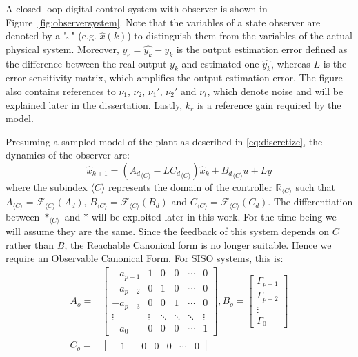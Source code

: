 \documentclass[sigconf]{llncs}
\newcommand{\mat}[1]{{#1}}
\renewcommand{\vec}[1]{{#1}}
\begin{document}
A closed-loop digital control system with observer is shown in Figure~\ref{fig:observersystem}.
Note that the variables of a state observer are denoted by a "$~\hat{}~$" (e.g. {$\hat {\vec{x}}(k)$})
to distinguish them from the variables of the actual physical system.
Moreover, $\vec{y}_e=\hat{\vec{y}_k}-\vec{y}_k$ is the output estimation error defined
as the difference between the real output $\vec{y}_k$ and estimated one $\hat{\vec{y}_k}$, whereas
$\mat{L}$ is the error sensitivity matrix, which amplifies the output estimation error.
The figure also contains references to $\nu_1$, $\nu_2$, $\nu_1'$, $\nu_2'$ and $\nu_t$, which
denote noise and will be explained later in the dissertation.
Lastly, $k_r$ is a reference gain required by the model.

Presuming a sampled model of the plant as described in \eqref{eq:discretize}, the dynamics of the observer are:
\begin{equation}
\label{eq:to_of}
\hat{\vec{x}}_{k+1}=({\mat{A}_d}_{\langle C \rangle}-\mat{L}{\mat{C}_d}_{\langle C \rangle})\hat{\vec{x}}_k+{\mat{B}_d}_{\langle C \rangle}\vec{u}+\mat{L}\vec{y}
\end{equation}
where the subindex ${\langle C \rangle}$ represents the domain of the controller $\mathbb{R}_{\langle C \rangle}$ such that ${\mat{A}_{\langle C \rangle}=\mathcal{F}_{\langle C \rangle}(\mat{A}_d)}$, ${\mat{B}_{\langle C \rangle}=\mathcal{F}_{\langle C \rangle}(\mat{B}_d)}$ and ${\mat{C}_{\langle C \rangle}=\mathcal{F}_{\langle C \rangle}(\mat{C}_d)}$.
The differentiation between $\mat{*}_{\langle C \rangle}$ and $\mat{*}$ will be exploited later in this work. For the time being we will assume they are the same. 
Since the feedback of this system depends on $\mat{C}$ rather than $\mat{B}$, the Reachable
Canonical form is no longer suitable. Hence we require an Observable Canonical Form.
For SISO systems, this is:
\begin{align}
\label{of_SISO}
\mat{A}_o=&\left[
\begin{array}{cccccc}
-a_{p-1}&1&0&0&\cdots&0\\
-a_{p-2}&0&1&0&\cdots&0\\
-a_{p-3}&0&0&1&\cdots&0\\
\vdots&\vdots&\ddots&\ddots&\ddots&\vdots\\
-a_0&0&0&0&\cdots&1
\end{array}\right],
\mat{B}_o=\left[
\begin{array}{c}
\Gamma_{p-1}\\ \Gamma_{p-2}\\ \vdots\\ \Gamma_0
\end{array}\right]\\
\mat{C}_o=&[\begin{array}{cccccc}\ \ \ \ 1&\ \ \ \ 0&0&0&\cdots&0\end{array}] \nonumber
\end{align}
\end{document}
